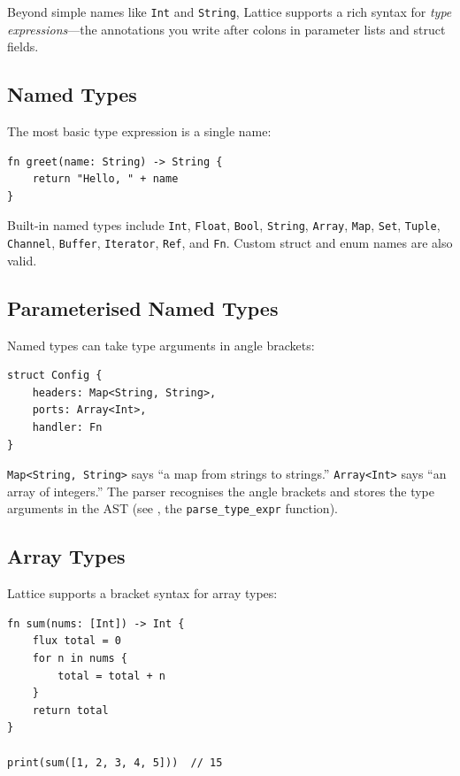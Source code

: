 Beyond simple names like \lstinline|Int| and \lstinline|String|, Lattice
supports a rich syntax for \emph{type expressions}---the annotations you
write after colons in parameter lists and struct fields.

\subsection{Named Types}

The most basic type expression is a single name:

\begin{lstlisting}[language=Lattice]
fn greet(name: String) -> String {
    return "Hello, " + name
}
\end{lstlisting}

Built-in named types include \lstinline|Int|, \lstinline|Float|,
\lstinline|Bool|, \lstinline|String|, \lstinline|Array|, \lstinline|Map|,
\lstinline|Set|, \lstinline|Tuple|, \lstinline|Channel|, \lstinline|Buffer|,
\lstinline|Iterator|, \lstinline|Ref|, and \lstinline|Fn|. Custom struct
and enum names are also valid.

\subsection{Parameterised Named Types}

Named types can take type arguments in angle brackets:

\begin{lstlisting}[language=Lattice, caption={Parameterised type expressions}]
struct Config {
    headers: Map<String, String>,
    ports: Array<Int>,
    handler: Fn
}
\end{lstlisting}

\lstinline|Map<String, String>| says ``a map from strings to strings.''
\lstinline|Array<Int>| says ``an array of integers.'' The parser recognises
the angle brackets and stores the type arguments in the AST (see
, the \texttt{parse\_type\_expr} function).

\subsection{Array Types}

Lattice supports a bracket syntax for array types:

\begin{lstlisting}[language=Lattice, caption={Array type annotation}]
fn sum(nums: [Int]) -> Int {
    flux total = 0
    for n in nums {
        total = total + n
    }
    return total
}

print(sum([1, 2, 3, 4, 5]))  // 15
\end{lstlisting}

